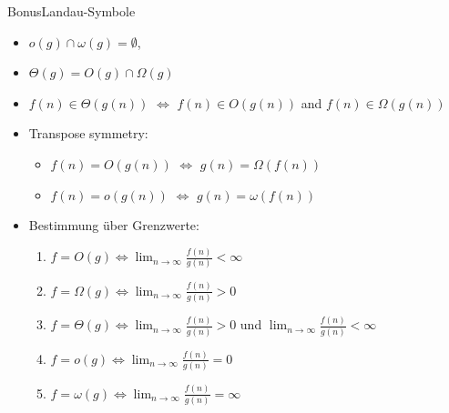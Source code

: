 \begin{frame}[allowframebreaks]{Bonus}{\vspace{0.5cm}Landau-Symbole}
\begin{itemize}
  \end{itemize}
  \begin{Sidenote}
    \begin{itemize}
      \item $o(g)\cap\omega(g)=\emptyset$, 
      \item $\Theta(g) = O(g)\cap\Omega(g)$
      \item $f(n)\in\Theta(g(n))$ $\Leftrightarrow$ $f(n)\in O(g(n))$ and $f(n)\in \Omega(g(n))$
    \end{itemize}
  \end{Sidenote}
  \begin{itemize}
    \item \alert{Transpose symmetry:}
    \begin{itemize}
      \item $f(n)=O(g(n))$ $\Leftrightarrow$ $g(n)=\Omega(f(n))$
      \item $f(n)=o(g(n))$ $\Leftrightarrow$ $g(n)=\omega(f(n))$
    \end{itemize}
    \item \alert{Bestimmung über Grenzwerte:}
    \begin{enumerate}
      \item $\displaystyle f=O(g) \Leftrightarrow \operatorname{lim}_{n\to\infty}\frac{f(n)}{g(n)} < \infty$
      \item $\displaystyle f=\Omega(g) \Leftrightarrow \operatorname{lim}_{n\to\infty}\frac{f(n)}{g(n)} > 0$
      \item $\displaystyle f=\Theta(g) \Leftrightarrow \operatorname{lim}_{n\to\infty}\frac{f(n)}{g(n)} > 0$ und $\displaystyle\operatorname{lim}_{n\to\infty}\frac{f(n)}{g(n)} < \infty$
      \item $\displaystyle f=o(g) \Leftrightarrow \operatorname{lim}_{n\to\infty}\frac{f(n)}{g(n)} = 0$
      \item $\displaystyle f=\omega(g) \Leftrightarrow \operatorname{lim}_{n\to\infty}\frac{f(n)}{g(n)} = \infty$
    \end{enumerate}
  \end{itemize}
\end{frame}

